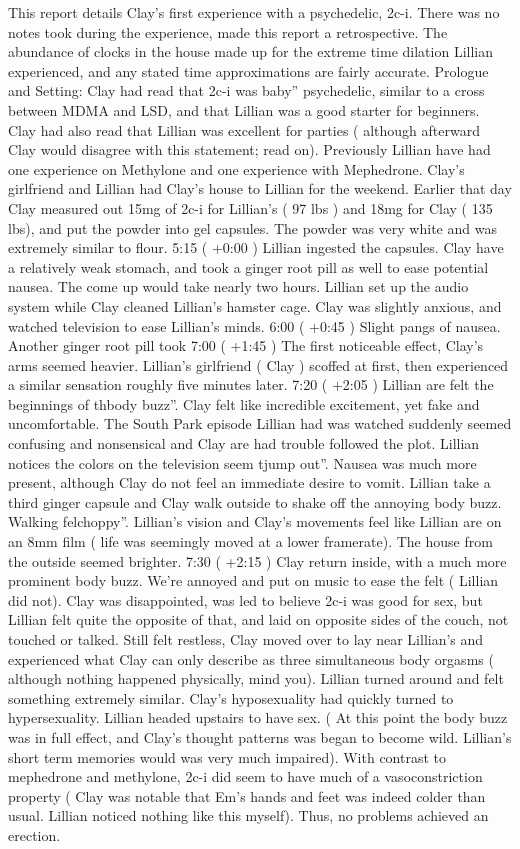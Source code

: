 \documentclass[12pt]{book}
\begin{document}
This report details Clay's first experience with a psychedelic, 2c-i. There was no notes took during the experience, made this report a retrospective. The abundance of clocks in the house made up for the extreme time dilation Lillian experienced, and any stated time approximations are fairly accurate. Prologue and Setting: Clay had read that 2c-i was baby'' psychedelic, similar to a cross between MDMA and LSD, and that Lillian was a good starter for beginners. Clay had also read that Lillian was excellent for parties ( although afterward Clay would disagree with this statement; read on). Previously Lillian have had one experience on Methylone and one experience with Mephedrone. Clay's girlfriend and Lillian had Clay's house to Lillian for the weekend. Earlier that day Clay measured out 15mg of 2c-i for Lillian's ( 97 lbs ) and 18mg for Clay ( 135 lbs), and put the powder into gel capsules. The powder was very white and was extremely similar to flour. 5:15 ( +0:00 ) Lillian ingested the capsules. Clay have a relatively weak stomach, and took a ginger root pill as well to ease potential nausea. The come up would take nearly two hours. Lillian set up the audio system while Clay cleaned Lillian's hamster cage. Clay was slightly anxious, and watched television to ease Lillian's minds. 6:00 ( +0:45 ) Slight pangs of nausea. Another ginger root pill took 7:00 ( +1:45 ) The first noticeable effect, Clay's arms seemed heavier. Lillian's girlfriend ( Clay ) scoffed at first, then experienced a similar sensation roughly five minutes later. 7:20 ( +2:05 ) Lillian are felt the beginnings of thbody buzz''. Clay felt like incredible excitement, yet fake and uncomfortable. The South Park episode Lillian had was watched suddenly seemed confusing and nonsensical and Clay are had trouble followed the plot. Lillian notices the colors on the television seem tjump out''. Nausea was much more present, although Clay do not feel an immediate desire to vomit. Lillian take a third ginger capsule and Clay walk outside to shake off the annoying body buzz. Walking felchoppy''. Lillian's vision and Clay's movements feel like Lillian are on an 8mm film ( life was seemingly moved at a lower framerate). The house from the outside seemed brighter. 7:30 ( +2:15 ) Clay return inside, with a much more prominent body buzz. We're annoyed and put on music to ease the felt ( Lillian did not). Clay was disappointed, was led to believe 2c-i was good for sex, but Lillian felt quite the opposite of that, and laid on opposite sides of the couch, not touched or talked. Still felt restless, Clay moved over to lay near Lillian's and experienced what Clay can only describe as three simultaneous body orgasms ( although nothing happened physically, mind you). Lillian turned around and felt something extremely similar. Clay's hyposexuality had quickly turned to hypersexuality. Lillian headed upstairs to have sex. ( At this point the body buzz was in full effect, and Clay's thought patterns was began to become wild. Lillian's short term memories would was very much impaired). With contrast to mephedrone and methylone, 2c-i did seem to have much of a vasoconstriction property ( Clay was notable that Em's hands and feet was indeed colder than usual. Lillian noticed nothing like this myself). Thus, no problems achieved an erection. 
\end{document}
